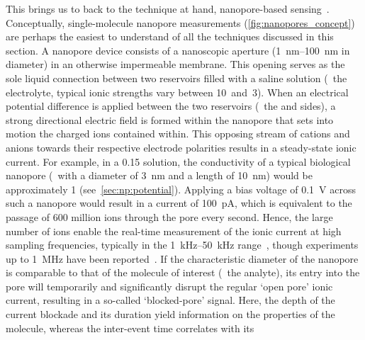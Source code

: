This brings us to back to the technique at hand, nanopore-based sensing~\cite{Howorka-2009,Wang-2018}.
Conceptually, single-molecule nanopore measurements (\cref{fig:nanopores_concept}) are perhaps the easiest to
understand of all the techniques discussed in this section. A nanopore device consists of a nanoscopic
aperture (\SIrange{1}{100}{\nm} in diameter) in an otherwise impermeable membrane. This opening serves as the
sole liquid connection between two reservoirs filled with a saline solution (\ie~the electrolyte, typical
ionic strengths vary between \SI{10}{\mM}~and~\SI{3}{\Molar}). When an electrical potential difference is
applied between the two reservoirs (\ie~the \cisi{} and \transi{} sides), a strong directional electric field
is formed within the nanopore that sets into motion the charged ions contained within. This opposing stream of
cations and anions towards their respective electrode polarities results in a steady-state ionic current. For
example, in a \SI{0.15}{\Molar}  solution, the conductivity of a typical biological nanopore (\eg~with
a diameter of \SI{3}{\nm} and a length of \SI{10}{\nm}) would be approximately \SI{1}{\nS}
(see~\cref{sec:np:potential}). Applying a bias voltage of \SI{0.1}{\volt} across such a nanopore would result
in a current of \SI{100}{\pA}, which is equivalent to the passage of \num{600} million ions through the pore
every second. Hence, the large number of ions enable the real-time measurement of the ionic current at high
sampling frequencies, typically in the \SIrange{1}{50}{\kHz} range~\cite{Maglia-2010}, though experiments up
to \SI{1}{\mega\hertz} have been reported~\cite{Rosenstein-2012}.\footnotemark%
%
%
If the characteristic diameter of the nanopore is comparable to that of the molecule of interest (\ie~the
analyte), its entry into the pore will temporarily and significantly disrupt the regular `open pore' ionic
current, resulting in a so-called `blocked-pore' signal. Here, the depth of the current blockade and its
duration yield information on the properties of the molecule, whereas the inter-event time correlates with its
